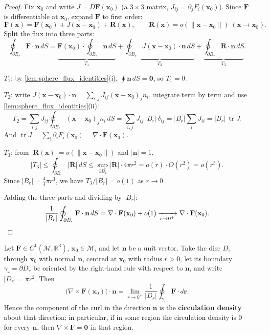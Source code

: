 \begin{proof}
Fix $\mathbf{x}_0$ and write $J = D\mathbf F(\mathbf x_0)$ (a $3\times3$ matrix, $J_{ij} = \partial_j F_i(\mathbf x_0)$). Since $\mathbf F$ is differentiable at $\mathbf x_0$, expand $\mathbf F$ to first order:
\[
\mathbf F(\mathbf x) = \mathbf F(\mathbf x_0) + J(\mathbf x-\mathbf x_0) + \mathbf R(\mathbf x),
\qquad \mathbf R(\mathbf x) = o(\|\mathbf x-\mathbf x_0\|)\;(\mathbf x\to\mathbf x_0).
\]
Split the flux into three parts:
\[
\oint_{\partial B_r}\mathbf F\cdot\mathbf n\,dS
= \underbrace{\mathbf F(\mathbf x_0)\cdot\oint_{\partial B_r}\mathbf n\,dS}_{T_1}
+ \underbrace{\oint_{\partial B_r} J(\mathbf x-\mathbf x_0)\cdot\mathbf n\,dS}_{T_2}
+ \underbrace{\oint_{\partial B_r}\mathbf R\cdot\mathbf n\,dS}_{T_3}.
\]

\textbf{$T_1$}: by \cref{lem:sphere_flux_identities}(i), $\oint \mathbf n\,dS = \mathbf 0$, so $T_1=0$.

\textbf{$T_2$}: write $J(\mathbf x-\mathbf x_0)\cdot\mathbf n = \sum_{i,j} J_{ij}(\mathbf x-\mathbf x_0)_j n_i$, integrate term by term and use \cref{lem:sphere_flux_identities}(ii):
\[
T_2 = \sum_{i,j} J_{ij}\oint_{\partial B_r}(\mathbf x-\mathbf x_0)_j n_i\,dS
= \sum_{i,j} J_{ij}\,|B_r|\,\delta_{ij}
= |B_r|\sum_{i} J_{ii}
= |B_r|\,\operatorname{tr}J .
\]
And $\operatorname{tr}J = \sum_i \partial_i F_i(\mathbf x_0) = \nabla\cdot\mathbf F(\mathbf x_0)$.

\textbf{$T_3$}: from $|\mathbf R(\mathbf x)| = o(\|\mathbf x-\mathbf x_0\|)$ and $|\mathbf n|=1$,
\[
|T_3| \le \oint_{\partial B_r}|\mathbf R|\,dS \le \sup_{\partial B_r}|\mathbf R| \cdot 4\pi r^2 = o(r)\cdot O(r^2)= o(r^3).
\]
Since $|B_r| = \tfrac43\pi r^3$, we have $T_3/|B_r| = o(1)$ as $r\to0$.

Adding the three parts and dividing by $|B_r|$:
\[
\frac{1}{|B_r|}\oint_{\partial B_r}\mathbf F\cdot\mathbf n\,dS
= \nabla\cdot\mathbf F(\mathbf x_0) + o(1) \xrightarrow[r\to0^+]{}\nabla\cdot\mathbf F(\mathbf x_0). \qedhere
\]
\end{proof}

\begin{proposition}\label{prop:curl_circulation_density}
Let $\mathbf{F} \in C^1(\mathcal{M}, \mathbb{R}^3)$, $\mathbf{x}_0 \in \mathcal{M}$, and let $\mathbf n$ be a unit vector. Take the disc $D_r$ through $\mathbf x_0$ with normal $\mathbf n$, centred at $\mathbf x_0$ with radius $r>0$, let its boundary $\gamma_r = \partial D_r$ be oriented by the right-hand rule with respect to $\mathbf n$, and write $|D_r| = \pi r^2$. Then
\[
\bigl(\nabla \times \mathbf{F}(\mathbf{x}_0)\bigr)\cdot\mathbf{n}
= \lim_{r \to 0^{+}} \frac{1}{|D_r|}\oint_{\gamma_r} \mathbf{F} \cdot d\mathbf{r} .
\]
Hence the component of the curl in the direction $\mathbf n$ is the \textbf{circulation density} about that direction; in particular, if in some region the circulation density is $0$ for every $\mathbf n$, then $\nabla\times\mathbf F=\mathbf 0$ in that region.
\end{proposition}

